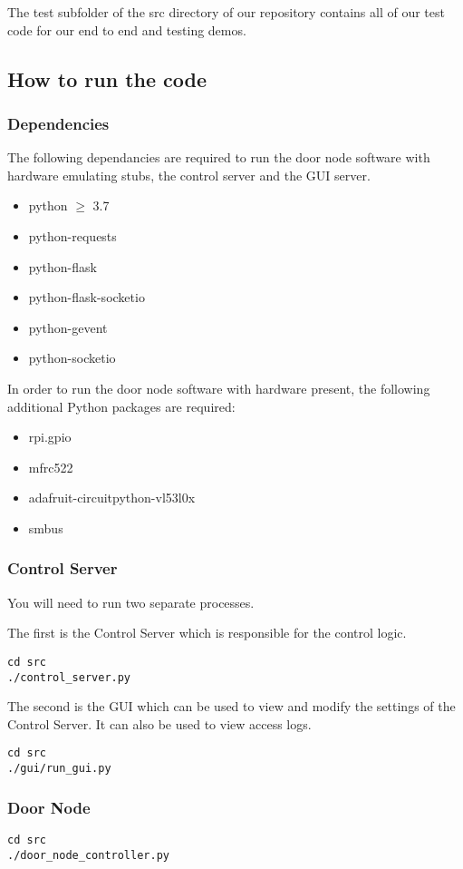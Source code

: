 The test subfolder of the src directory of our repository contains all of our
test code for our end to end and testing demos.

\subsection{How to run the code}

\subsubsection{Dependencies}

The following dependancies are required to run the door node software with
hardware emulating stubs, the control server and the GUI server.

\begin{itemize}
    \item python $\geq$ 3.7
    \item python-requests
    \item python-flask
    \item python-flask-socketio
    \item python-gevent
    \item python-socketio
\end{itemize}

\noindent
In order to run the door node software with hardware present, the following
additional Python packages are required:

\begin{itemize}
    \item rpi.gpio
    \item mfrc522
    \item adafruit-circuitpython-vl53l0x
    \item smbus
\end{itemize}

\subsubsection{Control Server}

You will need to run two separate processes.

\noindent
The first is the Control Server which is responsible for the control logic.

\begin{verbatim}
cd src
./control_server.py
\end{verbatim}

\noindent
The second is the GUI which can be used to view and modify the settings of the
Control Server. It can also be used to view access logs.

\begin{verbatim}
cd src
./gui/run_gui.py
\end{verbatim}

\subsubsection{Door Node}

\begin{verbatim}
cd src
./door_node_controller.py
\end{verbatim}

